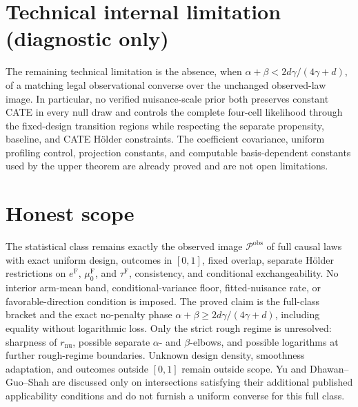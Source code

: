 \documentclass{article}
\begin{document}
\section*{Technical internal limitation (diagnostic only)}

The remaining technical limitation is the absence, when \(\alpha+\beta<2d\gamma/(4\gamma+d)\), of a matching legal observational converse over the unchanged observed-law image. In particular, no verified nuisance-scale prior both preserves constant CATE in every null draw and controls the complete four-cell likelihood through the fixed-design transition regions while respecting the separate propensity, baseline, and CATE Hölder constraints. The coefficient covariance, uniform profiling control, projection constants, and computable basis-dependent constants used by the upper theorem are already proved and are not open limitations.

\section{Honest scope}

The statistical class remains exactly the observed image \(\mathcal P^{\mathrm{obs}}\) of full causal laws with exact uniform design, outcomes in \([0,1]\), fixed overlap, separate Hölder restrictions on \(e^{\mathrm F}\), \(\mu_0^{\mathrm F}\), and \(\tau^{\mathrm F}\), consistency, and conditional exchangeability. No interior arm-mean band, conditional-variance floor, fitted-nuisance rate, or favorable-direction condition is imposed. The proved claim is the full-class bracket and the exact no-penalty phase \(\alpha+\beta\ge2d\gamma/(4\gamma+d)\), including equality without logarithmic loss. Only the strict rough regime is unresolved: sharpness of \(r_{\mathrm{nu}}\), possible separate \(\alpha\)- and \(\beta\)-elbows, and possible logarithms at further rough-regime boundaries. Unknown design density, smoothness adaptation, and outcomes outside \([0,1]\) remain outside scope. Yu and Dhawan--Guo--Shah are discussed only on intersections satisfying their additional published applicability conditions and do not furnish a uniform converse for this full class.
\end{document}
